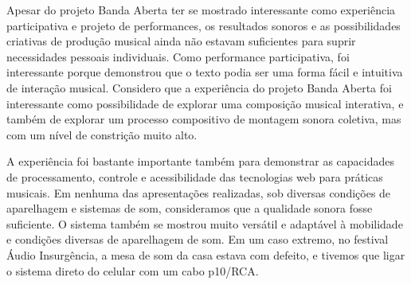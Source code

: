 


Apesar do projeto Banda Aberta ter se mostrado interessante como experiência participativa e projeto de performances, os resultados sonoros e as possibilidades criativas de produção musical ainda não estavam suficientes para suprir necessidades pessoais individuais. Como performance participativa, foi interessante porque demonstrou que o texto podia ser uma forma fácil e intuitiva de interação musical. Considero que a experiência do projeto Banda Aberta foi interessante como possibilidade de explorar uma composição musical interativa, e também de explorar um processo compositivo de montagem sonora coletiva, mas com um nível de constrição muito alto. 

A experiência foi bastante importante também para demonstrar as capacidades de processamento, controle e acessibilidade das tecnologias web para práticas musicais. Em nenhuma das apresentações realizadas, sob diversas condições de aparelhagem e sistemas de som, consideramos que a qualidade sonora fosse suficiente. O sistema também se mostrou muito versátil e adaptável à mobilidade e condições diversas de aparelhagem de som. Em um caso extremo, no festival Áudio Insurgência, a mesa de som da casa estava com defeito, e tivemos que ligar o sistema direto do celular com um cabo p10/RCA.

